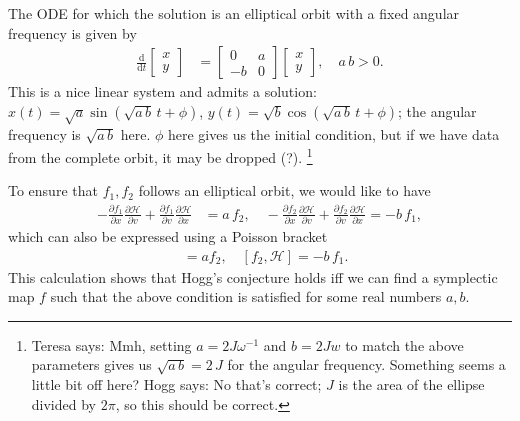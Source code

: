 \documentclass{article}
\newcommand{\dd}{\mathrm{d}}
\begin{document}
The ODE for which the solution is an elliptical orbit with a fixed angular frequency is given by 
\begin{align}
    \frac{\dd}{\dd t} \begin{bmatrix} x \\ y \end{bmatrix} &= \begin{bmatrix} 0 & a \\ -b & 0 \end{bmatrix} \begin{bmatrix} x \\ y \end{bmatrix}, \quad a\,b > 0. 
\end{align}
This is a nice linear system and admits a solution:  $x(t)=\sqrt{a} \sin(\sqrt{a\,b}\,t + \phi) $, $y(t)= \sqrt{b} \cos(\sqrt{a\,b}\,t + \phi)$; the angular frequency is $\sqrt{a\,b}$ here. $\phi$ here gives us the initial condition, but if we have data from the complete orbit, it may be dropped (?). \footnote{Teresa says: Mmh, setting $a = 2 J \omega^{-1}$ and $b = 2 J w$ to match the above parameters gives us $\sqrt{a\,b}=2\,J$ for the angular frequency. Something seems a little bit off here? Hogg says: No that's correct; $J$ is the area of the ellipse divided by $2\pi$, so this should be correct.}

To ensure that $f_1, f_2$ follows an elliptical orbit, we would like to have
\begin{align}
    - \frac{\partial f_1}{\partial x} \frac{\partial \mathcal{H}}{\partial v} + \frac{\partial f_1}{\partial v} \frac{\partial \mathcal{H}}{\partial x} &= a\,f_2, \quad
     - \frac{\partial f_2}{\partial x} \frac{\partial \mathcal{H}}{\partial v} + \frac{\partial f_2}{\partial v} \frac{\partial \mathcal{H}}{\partial x} = -b\,f_1,
\end{align}
which can also be expressed using a Poisson bracket 
\begin{align}
    [f_1, \mathcal{H}] &= a f_2, \quad [f_2, \mathcal{H}] = -b\,f_1. 
\end{align}
This calculation shows that Hogg's conjecture holds iff we can find a symplectic map $f$ such that the above condition is satisfied for some real numbers $a, b$. 
\end{document}

